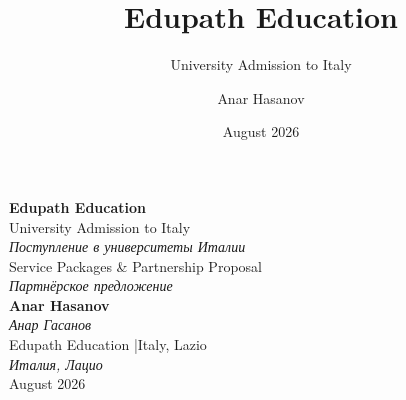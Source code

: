 \documentclass[aspectratio=169]{beamer}
\title{\textbf{Edupath Education}}
\subtitle{University Admission to Italy}
\author{Anar Hasanov}
\institute{Edupath Education \quad|\quad Italy, Lazio}
\date{August 2026}
\newcommand{\ru}[1]{{\textit{#1}}}
\begin{document}
\begin{frame}[plain]
\centering
\vfill
{\Large\textbf{Edupath Education}}\\[0.3em]
{\normalsize University Admission to Italy}\\[0.2em]
{\ru{Поступление в университеты Италии}}\\[1em]
{\small Service Packages \& Partnership Proposal}\\[0.2em]
{\ru{Партнёрское предложение}}\\[1.5em]
{\small\textbf{Anar Hasanov}}\\[0.1em]
{\ru{Анар Гасанов}}\\[0.3em]
{\footnotesize Edupath Education \quad|\quad Italy, Lazio}\\[0.1em]
{\ru{Италия, Лацио}}\\[0.5em]
{\footnotesize August 2026}
\vfill
\end{frame}
\end{document}
